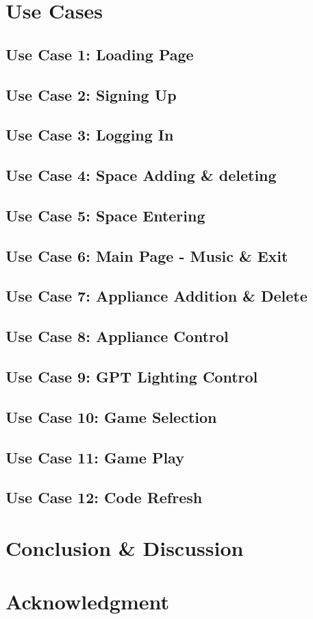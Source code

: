 \documentclass[conference]{IEEEtran}
\begin{document}
\section{Use Cases}
    \subsection{Use Case 1: Loading Page}
    \subsection{Use Case 2: Signing Up}
    \subsection{Use Case 3: Logging In}
    \subsection{Use Case 4: Space Adding \& deleting}
    \subsection{Use Case 5: Space Entering}
    \subsection{Use Case 6: Main Page - Music \& Exit}
    \subsection{Use Case 7: Appliance Addition \& Delete}
    \subsection{Use Case 8: Appliance Control}
    \subsection{Use Case 9: GPT Lighting Control}
    \subsection{Use Case 10: Game Selection}
    \subsection{Use Case 11: Game Play}
    \subsection{Use Case 12: Code Refresh}
\section{Conclusion \& Discussion}

\section*{Acknowledgment}
\end{document}
